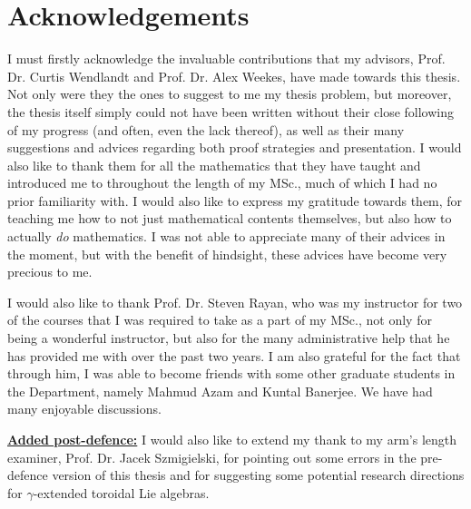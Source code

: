 \section*{Acknowledgements}
    I must firstly acknowledge the invaluable contributions that my advisors, Prof. Dr. Curtis Wendlandt and Prof. Dr. Alex Weekes, have made towards this thesis. Not only were they the ones to suggest to me my thesis problem, but moreover, the thesis itself simply could not have been written without their close following of my progress (and often, even the lack thereof), as well as their many suggestions and advices regarding both proof strategies and presentation. I would also like to thank them for all the mathematics that they have taught and introduced me to throughout the length of my MSc., much of which I had no prior familiarity with. I would also like to express my gratitude towards them, for teaching me how to not just mathematical contents themselves, but also how to actually \textit{do} mathematics. I was not able to appreciate many of their advices in the moment, but with the benefit of hindsight, these advices have become very precious to me.
    
    I would also like to thank Prof. Dr. Steven Rayan, who was my instructor for two of the courses that I was required to take as a part of my MSc., not only for being a wonderful instructor, but also for the many administrative help that he has provided me with over the past two years. I am also grateful for the fact that through him, I was able to become friends with some other graduate students in the Department, namely Mahmud Azam and Kuntal Banerjee. We have had many enjoyable discussions.

    \textbf{\underline{Added post-defence:}} I would also like to extend my thank to my arm's length examiner, Prof. Dr. Jacek Szmigielski, for pointing out some errors in the pre-defence version of this thesis and for suggesting some potential research directions for $\gamma$-extended toroidal Lie algebras.